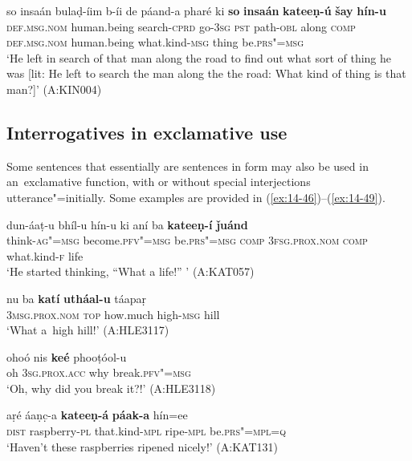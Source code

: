 \begin{exe}
\ex
\label{ex:14-45}
\gll so insaán bulaḍ-íim b-íi de páand-a pharé ki \textbf{so} \textbf{insaán} \textbf{kateeṇ-ú} \textbf{šay} \textbf{hín-u}\\
\textsc{def.msg.nom} human.being search-\textsc{cprd} go-\textsc{3sg} \textsc{pst} path-\textsc{obl} along \textsc{comp} \textsc{def.msg.nom} human.being what.kind-\textsc{msg} thing be.\textsc{prs"=msg}\\
\glt `He left in search of that man along the road to find out what sort of thing he was [lit: He left to search the man along the the road: What kind of thing is that man?]' (A:KIN004)
\end{exe}

\subsection{Interrogatives in exclamative use}
\label{subsec:14-2-4}

Some sentences that essentially are  sentences in form may also be used in an~exclamative function, with or without special interjections utterance"=initially. Some examples are provided in (\ref{ex:14-46})--(\ref{ex:14-49}). 

\ea
\label{ex:14-46}
\gll dun-áaṭ-u bhíl-u hín-u ki  aní ba \textbf{kateeṇ-í} \textbf{ǰuánd} \\
think-\textsc{ag"=msg} become.\textsc{pfv"=msg} be.\textsc{prs"=msg} \textsc{comp}  \textsc{3fsg.prox.nom} \textsc{comp} what.kind-\textsc{f} life  \\
\glt `He started thinking, ``What a life!'' ' (A:KAT057)

\ex
\label{ex:14-47}
\gll nu ba \textbf{katí} \textbf{utháal-u} táapaṛ \\
\textsc{3msg.prox.nom} \textsc{top} how.much high-\textsc{msg} hill  \\
\glt `What a~high hill!' (A:HLE3117)

\ex
\label{ex:14-48}
\gll ohoó nis \textbf{keé} phooṭóol-u \\
oh \textsc{3sg.prox.acc} why break.\textsc{pfv"=msg} \\
\glt `Oh, why did you break it?!' (A:HLE3118)

\ex
\label{ex:14-49}
\gll aṛé áaṇc̣-a \textbf{kateeṇ-á} \textbf{páak-a} hín=ee \\
\textsc{dist} raspberry-\textsc{pl} that.kind-\textsc{mpl} ripe-\textsc{mpl} be.\textsc{prs"=mpl=q} \\
\glt `Haven't these raspberries ripened nicely!' (A:KAT131)
\z

